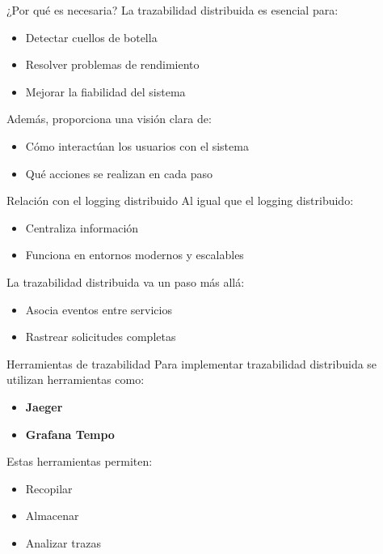 \documentclass{beamer}
\begin{document}
\begin{frame}{¿Por qué es necesaria?}
La trazabilidad distribuida es esencial para:
\begin{itemize}
    \item Detectar cuellos de botella
    \item Resolver problemas de rendimiento
    \item Mejorar la fiabilidad del sistema
\end{itemize}

\vspace{0.3cm}
Además, proporciona una visión clara de:
\begin{itemize}
    \item Cómo interactúan los usuarios con el sistema
    \item Qué acciones se realizan en cada paso
\end{itemize}
\end{frame}

\begin{frame}{Relación con el logging distribuido}
Al igual que el logging distribuido:
\begin{itemize}
    \item Centraliza información
    \item Funciona en entornos modernos y escalables
\end{itemize}

\vspace{0.3cm}
La trazabilidad distribuida va un paso más allá:
\begin{itemize}
    \item Asocia eventos entre servicios
    \item Rastrear solicitudes completas
\end{itemize}
\end{frame}

\begin{frame}{Herramientas de trazabilidad}
Para implementar trazabilidad distribuida se utilizan herramientas como:
\begin{itemize}
    \item \textbf{Jaeger}
    \item \textbf{Grafana Tempo}
\end{itemize}

\vspace{0.3cm}
Estas herramientas permiten:
\begin{itemize}
    \item Recopilar
    \item Almacenar
    \item Analizar trazas
\end{itemize}
\end{frame}
\end{document}
